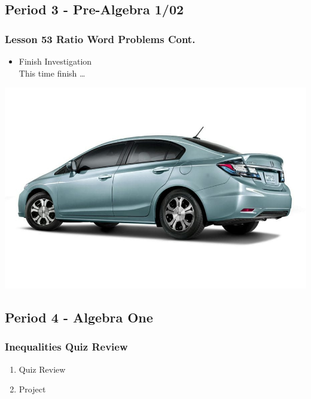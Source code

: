   \subsection[PA1/02]{Period 3 - Pre-Algebra 1/02}
	 \begin{frame}[label=PA1_02]
	 	       	\frametitle{Lesson 53 Ratio Word Problems Cont.}

	 	       	\begin{itemize}
	 	       		\item Finish  Investigation
	 	       		\\ This time  finish \dots
	 	       	\end{itemize}
	 	       	\vspace{-20pt}
	 	       	\begin{center}
	 	       		\includegraphics[width=0.5\linewidth]{Images/honda_civic}
	 	       	\end{center}
	 	       	\vspace{-20pt}
	 	       \end{frame}

 \subsection[ALG]{Period 4 - Algebra One}
 \begin{frame}[label=ALG1]
 	\frametitle{Inequalities Quiz Review}

        \begin{enumerate}
   	   	   \item Quiz Review 
   	   	   \item {} Project 
   	     \end{enumerate}

 	 	\end{frame}


